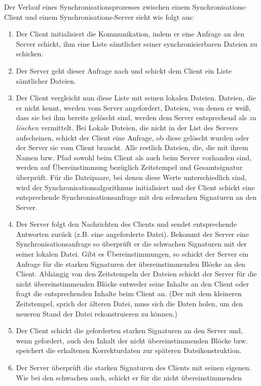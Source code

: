 Der Verlauf eines Synchronisationsprozesses zwischen einem Synchronisations-Client und einem Synchronisations-Server sieht wie folgt aus:
\begin{enumerate}
\item Der Client initialisiert die Kommunikation, indem er eine Anfrage an den Server schickt, ihm eine Liste sämtlicher seiner synchronisierbaren 
      Dateien zu schicken.
\item Der Server geht dieser Anfrage nach und schickt dem Client ein Liste sämtlicher Dateien.
\item Der Client vergleicht nun diese Liste mit seinen lokalen Dateien. Dateien, die er nicht kennt, werden vom Server angefordert, Dateien, 
      von denen er weiß, dass sie bei ihm bereits gelöscht sind, werden dem Server entsprechend als \emph{zu löschen} vermittelt. Bei Lokale Dateien, 
      die nicht in der List des Servers aufscheinen, schickt der Client eine Anfrage, ob diese gelöscht wurden oder der Server sie vom Client braucht.  
      Alle restlich Dateien, die, die mit ihrem Namen bzw. Pfad sowohl beim Client als auch beim Server vorhanden sind, werden auf Übereinstimmung bezüglich 
      Zeitstempel und Gesamtsignatur überprüft. Für die Dateipaare, bei denen diese Werte unterschiedlich sind, wird der Synchronisationsalgorithmus 
      initialisiert und der Client schickt eine entsprechende Synchronisationsanfrage mit den schwachen Signaturen an den Server.
\item Der Server folgt den Nachrichten des Clients und sendet entsprechende Antworten zurück (z.B. eine angeforderte Datei). 
      Bekommt der Server eine Synchronisationsanfrage so überprüft er die schwachen Signaturen mit der seiner lokalen Datei. Gibt es Übereinstimmungen, 
      so schickt der Server ein Anfrage für die starken Signaturen der übereinstimmenden Blöcke an den Client. Abhängig von den Zeitstempeln der Dateien 
      schickt der Server für die nicht übereinstimmenden Blöcke entweder seine Inhalte an den Client oder fragt die entsprechenden Inhalte beim Client an. 
      (Der mit dem kleineren Zeitstempel, sprich der älteren Datei, muss sich die Daten holen, um den neueren Stand der Datei rekonstruieren zu können.)
\item Der Client schickt die geforderten starken Signaturen an den Server und, wenn gefordert, auch den Inhalt der nicht übereinstimmenden Blöcke bzw. 
      speichert die erhaltenen Korrekturdaten zur späteren Dateikonstruktion.
\item Der Server überprüft die starken Signaturen des Clients mit seinen eigenen. Wie bei den schwachen auch, schickt er für die nicht übereinstimmenden 

\end{enumerate}
